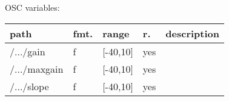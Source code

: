 \begin{snugshade}
{\footnotesize
\label{osctab:tascarapgainramp}
OSC variables:
\nopagebreak

\begin{tabularx}{\textwidth}{llllX}
\hline
path & fmt. & range & r. & description\\
\hline
/.../gain & f & [-40,10] & yes & \\
/.../maxgain & f & [-40,10] & yes & \\
/.../slope & f & [-40,10] & yes & \\
\hline
\end{tabularx}
}
\end{snugshade}
